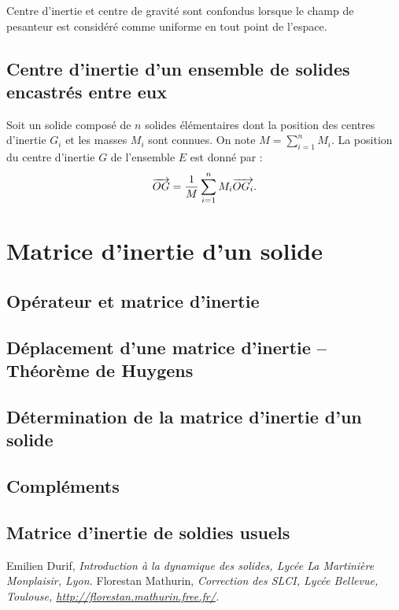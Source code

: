 \documentclass[10pt,fleqn]{article} %
\begin{document}
\begin{rem}
Centre d'inertie et centre de gravité sont confondus lorsque le champ de pesanteur est considéré comme uniforme en tout point de l'espace. 
\end{rem}

\subsection{Centre d'inertie d'un ensemble de solides encastrés entre eux}
\begin{methode}
Soit un solide composé de $n$ solides élémentaires dont la position des centres d'inertie $G_i$ et les masses $M_i$ sont connues. On note $M=\sum\limits_{i=1}^{n}M_i$.  La position du centre d'inertie $G$ de l'ensemble $E$ est donné par :
$$\overrightarrow{OG}=\dfrac{1}{M}\sum\limits_{i=1}^{n}M_i \overrightarrow{OG_i} .$$

\end{methode}




\section{Matrice d'inertie d'un solide}
\subsection{Opérateur et matrice d'inertie}

\subsection[Déplacement d'une matrice d'inertie]{Déplacement d'une matrice d'inertie -- Théorème de Huygens}

\subsection{Détermination de la matrice d'inertie d'un solide}

\subsection{Compléments}

\subsection{Matrice d'inertie de soldies usuels}


\begin{thebibliography}{2}
    Emilien Durif, {\it Introduction à la dynamique des solides, Lycée La Martinière Monplaisir, Lyon.}
       Florestan Mathurin, {\it Correction des SLCI, Lycée Bellevue, Toulouse, \url{http://florestan.mathurin.free.fr/}.}



\end{thebibliography}
\end{document}
